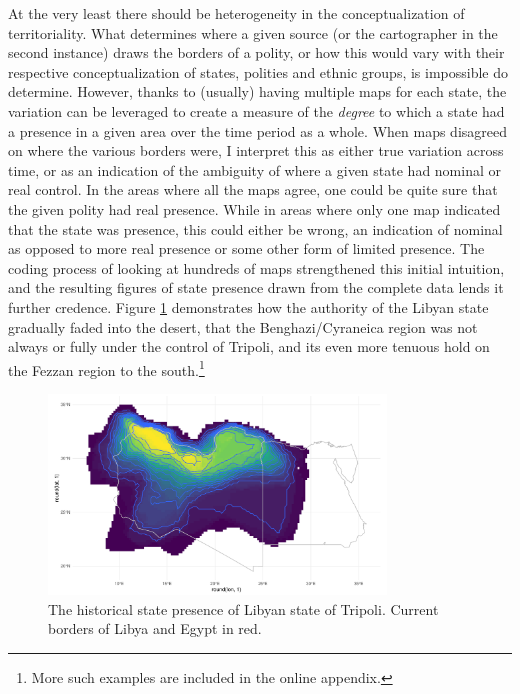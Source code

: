 \documentclass[12pt]{article}
\begin{document}
At the very least there should be heterogeneity in the conceptualization of
territoriality. What determines where a given source (or the cartographer in the
second instance) draws the borders of a polity, or how this would vary with
their respective conceptualization of states, polities and ethnic groups, is
impossible do determine. However, thanks to (usually) having multiple maps for
each state, the variation can be leveraged to create a measure of the
\textit{degree} to which a state had a presence in a given area over the time
period as a whole. When maps disagreed on where the various borders were, I
interpret this as either true variation across time, or as an indication of the
ambiguity of where a given state had nominal or real control. In the areas where
all the maps agree, one could be quite sure that the given polity had real
presence.  While in areas where only one map indicated that the state was
presence, this could either be wrong, an indication of nominal as opposed to
more real presence or some other form of limited presence. The coding process of
looking at hundreds of maps strengthened this initial intuition, and the
resulting figures of state presence drawn from the complete data lends it
further credence. Figure \ref{libya} demonstrates how the authority of the
Libyan state gradually faded into the desert, that the Benghazi/Cyraneica region
was not always or fully under the control of Tripoli, and its even more tenuous
hold on the Fezzan region to the south.\footnote{More such examples are included
in the online appendix.}


\begin{figure}[htpb]
	\centering
	\includegraphics[width=0.8\textwidth,keepaspectratio]{../R/Output/libya.pdf}
	\caption{The historical state presence of Libyan state of Tripoli.
	Current borders of Libya and Egypt in red.}
	\label{libya}
\end{figure}
\end{document}
